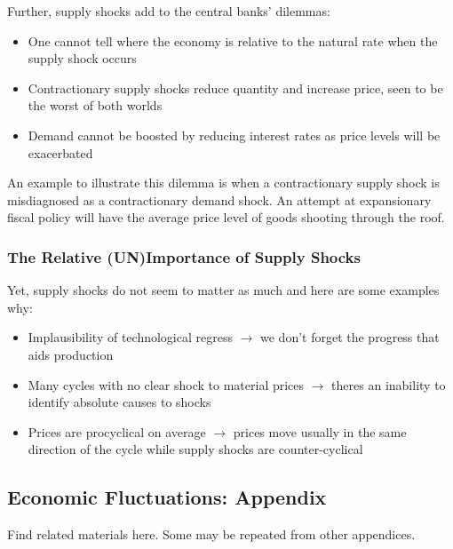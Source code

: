 \documentclass[12pt, letterpaper]{article}
\begin{document}
Further, supply shocks add to the central banks' dilemmas:
\begin{itemize}
	\item One cannot tell where the economy is relative to the natural rate when the supply shock occurs
	\item Contractionary supply shocks reduce quantity and increase price, seen to be the worst of both worlds
	\item Demand cannot be boosted by reducing interest rates as price levels will be exacerbated
\end{itemize}
An example to illustrate this dilemma is when a contractionary supply shock is misdiagnosed as a contractionary demand shock. An attempt at expansionary fiscal policy will have the average price level of goods shooting through the roof.

\subsubsection{The Relative (UN)Importance of Supply Shocks}
Yet, supply shocks do not seem to matter as much and here are some examples why:
\begin{itemize}
	\item Implausibility of technological regress $\rightarrow$ we don't forget the progress that aids production
	\item Many cycles with no clear shock to material prices $\rightarrow$ theres an inability to identify absolute causes to shocks
	\item Prices are procyclical on average $\rightarrow$ prices move usually in the same direction of the cycle while supply shocks are counter-cyclical
\end{itemize}

\subsection{Economic Fluctuations: Appendix}
Find related materials here. Some may be repeated from other appendices.
\end{document}
